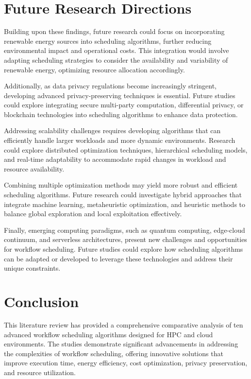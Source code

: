 \documentclass[a4paper, final]{article}
\begin{document}
\section{Future Research Directions}
Building upon these findings, future research could focus on incorporating renewable energy sources into scheduling algorithms, further reducing environmental impact and operational costs. This integration would involve adapting scheduling strategies to consider the availability and variability of renewable energy, optimizing resource allocation accordingly.

Additionally, as data privacy regulations become increasingly stringent, developing advanced privacy-preserving techniques is essential. Future studies could explore integrating secure multi-party computation, differential privacy, or blockchain technologies into scheduling algorithms to enhance data protection.

Addressing scalability challenges requires developing algorithms that can efficiently handle larger workloads and 
more dynamic environments. Research could explore distributed optimization techniques, hierarchical scheduling models, 
and real-time adaptability to accommodate rapid changes in workload and resource availability.

Combining multiple optimization methods may yield more robust and efficient scheduling algorithms. Future research could 
investigate hybrid approaches that integrate machine learning, metaheuristic optimization, and heuristic methods to balance 
global exploration and local exploitation effectively.

Finally, emerging computing paradigms, such as quantum computing, edge-cloud continuum, and serverless architectures, present new 
challenges and opportunities for workflow scheduling. Future studies could explore how scheduling algorithms can be 
adapted or developed to leverage these technologies and address their unique constraints.

\cleardoublepage
{}
\newpage
{}
\section*{Conclusion}
This literature review has provided a comprehensive comparative analysis of ten advanced workflow scheduling algorithms 
designed for HPC and cloud environments. The studies demonstrate significant advancements in addressing the complexities 
of workflow scheduling, offering innovative solutions that improve execution time, energy efficiency, cost optimization, 
privacy preservation, and resource utilization.
\end{document}
